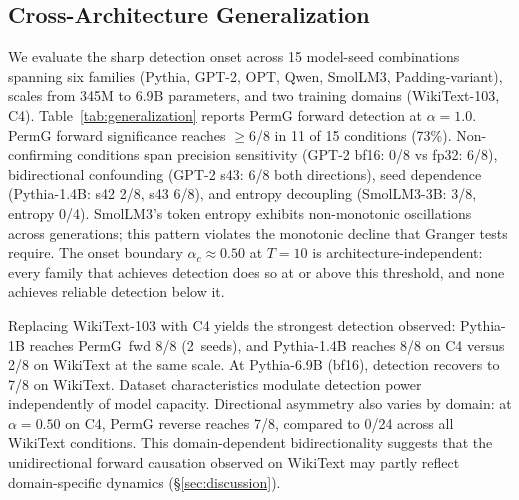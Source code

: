 \subsection{Cross-Architecture Generalization}
\label{sec:generalization}

We evaluate the sharp detection onset across 15 model-seed combinations spanning six families (Pythia, GPT-2, OPT, Qwen, SmolLM3, Padding-variant), scales from 345M to 6.9B parameters, and two training domains (WikiText-103, C4).
Table~\ref{tab:generalization} reports PermG forward detection at $\alpha{=}1.0$.
PermG forward significance reaches ${\geq}$6/8 in 11 of 15 conditions (73\%).
Non-confirming conditions span precision sensitivity (GPT-2 bf16: 0/8 vs fp32: 6/8), bidirectional confounding (GPT-2 s43: 6/8 both directions), seed dependence (Pythia-1.4B: s42 2/8, s43 6/8), and entropy decoupling (SmolLM3-3B: 3/8, entropy 0/4).
SmolLM3's token entropy exhibits non-monotonic oscillations across generations; this pattern violates the monotonic decline that Granger tests require.
The onset boundary $\alpha_c \approx 0.50$ at $T{=}10$ is architecture-independent: every family that achieves detection does so at or above this threshold, and none achieves reliable detection below it.

Replacing WikiText-103 with C4 yields the strongest detection observed: Pythia-1B reaches PermG~fwd 8/8 (2~seeds), and Pythia-1.4B reaches 8/8 on C4 versus 2/8 on WikiText at the same scale.
At Pythia-6.9B (bf16), detection recovers to 7/8 on WikiText.
Dataset characteristics modulate detection power independently of model capacity.
Directional asymmetry also varies by domain: at $\alpha{=}0.50$ on C4, PermG reverse reaches 7/8, compared to 0/24 across all WikiText conditions.
This domain-dependent bidirectionality suggests that the unidirectional forward causation observed on WikiText may partly reflect domain-specific dynamics (\S\ref{sec:discussion}).

